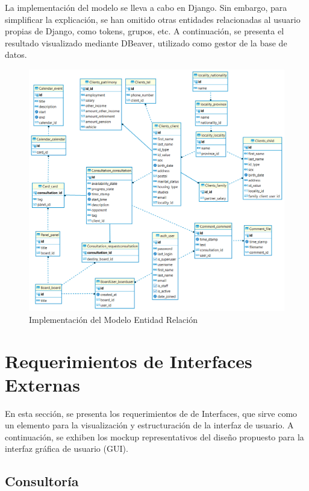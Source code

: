 \newpage

La implementación del modelo se lleva a cabo en Django. Sin embargo, para simplificar la explicación, se han omitido otras entidades relacionadas al usuario propias de Django, como tokens, grupos, etc. A continuación, se presenta el resultado visualizado mediante DBeaver, utilizado como gestor de la base de datos.

\begin{figure}[H]
    \centering
    \includegraphics[width=1\linewidth]{fig/dbeaver.png}
    \caption{Implementación del Modelo Entidad Relación}
    \label{fig:dbeaver}
\end{figure}




\section{Requerimientos de Interfaces Externas}


En esta sección, se presenta los requerimientos de de Interfaces, que sirve como un elemento para la visualización y estructuración de la interfaz de usuario. A continuación, se exhiben los mockup representativos del diseño propuesto para la interfaz gráfica de usuario (GUI).

\subsection{Consultoría}

